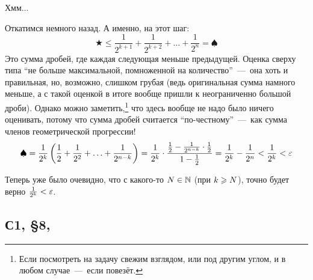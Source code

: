 \documentclass[a4paper,12pt]{article}
\begin{document}
\begin{solution}
    Хмм...
    
    \medskip
    
    Откатимся немного назад.
    А именно, на этот шаг:
    \[
      \bigstar \leq \frac{1}{2^{k + 1}} + \frac{1}{2^{k + 2}} + \ldots + \frac{1}{2^n} = \spadesuit
    \]
    Это сумма дробей, где каждая следующая меньше предыдущей.
    Оценка сверху типа ``не больше максимальной, помноженной на количество''~---~она хоть и правильная, но, возможно, слишком грубая (ведь оригинальная сумма намного меньше, а с такой оценкой в итоге вообще пришли к неограниченно большой дроби).
    Однако можно заметить,\footnote{
      Если посмотреть на задачу свежим взглядом, или под другим углом, и в любом случае~---~если повезёт.
    } что здесь вообще не надо было ничего оценивать, потому что сумма дробей считается ``по-честному''~---~как сумма членов геометрической прогрессии!
    \[
      \spadesuit = \frac{1}{2^k} \left(\frac{1}{2} + \frac{1}{2^2} + \ldots + \frac{1}{2^{n - k}}\right)
      = \frac{1}{2^k} \cdot \frac{\frac{1}{2} - \frac{1}{2^{n - k}} \cdot \frac{1}{2}}{1 - \frac{1}{2}}
      = \frac{1}{2^k} - \frac{1}{2^n}
      < \frac{1}{2^k} < \varepsilon
    \]
    
    Теперь уже было очевидно, что с какого-то $N \hm\in \NN$ (при $k \hm\geq N$), точно будет верно $\frac{1}{2^k} \hm< \eps$.
  \end{solution}
  
  
  \subsection{С1, \S 8, }
  
\end{document}
